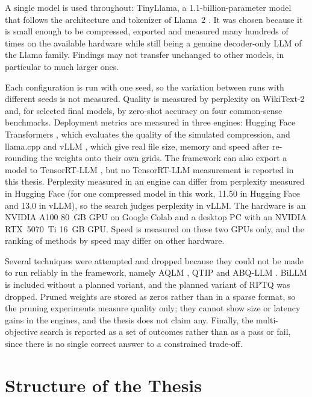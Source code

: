 A single model is used throughout: TinyLlama, a 1.1-billion-parameter model that follows the architecture and tokenizer of Llama~2 \cite{zhang2024tinyllama}. It was chosen because it is small enough to be compressed, exported and measured many hundreds of times on the available hardware while still being a genuine decoder-only LLM of the Llama family. Findings may not transfer unchanged to other models, in particular to much larger ones.

Each configuration is run with one seed, so the variation between runs with different seeds is not measured. Quality is measured by perplexity on WikiText-2 and, for selected final models, by zero-shot accuracy on four common-sense benchmarks. Deployment metrics are measured in three engines: Hugging Face Transformers \cite{wolf2020transformers}, which evaluates the quality of the simulated compression, and llama.cpp \cite{ggml2025llamacpp} and vLLM \cite{kwon2023vllm}, which give real file size, memory and speed after re-rounding the weights onto their own grids. The framework can also export a model to TensorRT-LLM \cite{nvidia2025tensorrtllm}, but no TensorRT-LLM measurement is reported in this thesis. Perplexity measured in an engine can differ from perplexity measured in Hugging Face (for one compressed model in this work, 11.50 in Hugging Face and 13.0 in vLLM), so the search judges perplexity in vLLM. The hardware is an NVIDIA A100 80~GB GPU on Google Colab and a desktop PC with an NVIDIA RTX~5070~Ti 16~GB GPU. Speed is measured on these two GPUs only, and the ranking of methods by speed may differ on other hardware.

Several techniques were attempted and dropped because they could not be made to run reliably in the framework, namely AQLM \cite{egiazarian2024aqlm}, QTIP \cite{tseng2024qtip} and ABQ-LLM \cite{zeng2025abqllm}. BiLLM \cite{huang2024billm} is included without a planned variant, and the planned variant of RPTQ \cite{yuan2023rptq} was dropped. Pruned weights are stored as zeros rather than in a sparse format, so the pruning experiments measure quality only; they cannot show size or latency gains in the engines, and the thesis does not claim any. Finally, the multi-objective search is reported as a set of outcomes rather than as a pass or fail, since there is no single correct answer to a constrained trade-off.

\section{Structure of the Thesis}
\label{sec:ch1-structure}

